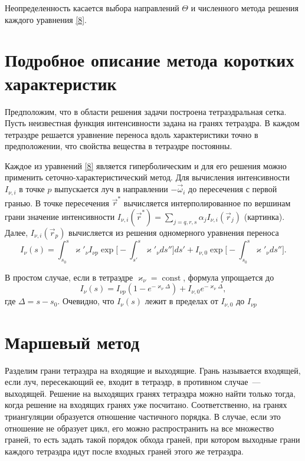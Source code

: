 Неопределенность касается выбора направлений $\Theta$ и численного метода решения каждого уравнения \eqref{8}.

\section{Подробное описание метода коротких характеристик}
Предположим, что в области решения задачи построена тетраэдральная сетка.
Пусть неизвестная функция интенсивности задана на гранях тетраэдра. В каждом тетраэдре решается уравнение переноса вдоль характеристики точно в предположении, что свойства вещества в тетраэдре постоянны. 

Каждое из уравнений \eqref{8} является гиперболическим и для его решения можно применить сеточно-характеристический метод. Для вычисления интенсивности $I_{\nu,i}$ в точке $p$ выпускается луч в направлении $-\vec\omega_i$ до пересечения с первой гранью. В точке пересечения $\vec r^*$ вычисляется интерполированное по вершинам грани значение интенсивности $I_{\nu, i} (\vec r^*) = \sum_{j = q,r,s} \alpha_jI_{\nu, i}(\vec r_j)$
(картинка). Далее, $I_{\nu, i} (\vec r_p)$ вычисляется из решения одномерного уравнения переноса   
\begin {equation}
I_{\nu}(s) = \int_{s_0}^s\varkappa'_{\nu}I_{\nu p} \exp\Big[-\int_{s'}^s\varkappa'_{\nu}ds''\Big]ds' + I_{\nu,0} \exp\Big[-\int_{s_0}^s \varkappa'_{\nu}ds''\Big].
\end {equation}

В простом случае, если в тетраэдре $\varkappa_\nu = \operatorname{const}$, формула упрощается до 
\begin {equation}
I_\nu (s) = I_{\nu p} (1 - e^{-\varkappa_\nu \Delta}) + I_{\nu,0}e^{-\varkappa_\nu \Delta},
\end {equation}
где $\Delta = s - s_0$. Очевидно, что $I_\nu(s)$ лежит в пределах от $I_{\nu, 0}$ до $I_{\nu p}$
\section{Маршевый метод}
Разделим грани тетраэдра на входящие и выходящие. Грань называется входящей, если луч, пересекающий ее, входит в тетраэдр, в противном случае~--- выходящей. Решение на выходящих гранях тетраэдра можно найти только тогда, когда решение на входящих гранях уже посчитано. Соответственно, на гранях триангуляции образуется отношение частичного порядка. В случае, если это отношение не образует цикл, его можно распространить на все множество граней, то есть задать такой порядок обхода граней, при котором выходные грани каждого тетраэдра идут после входных граней этого же тетраэдра. 

